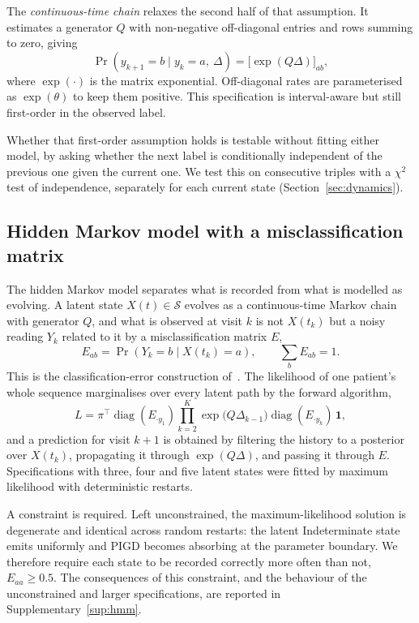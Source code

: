 \documentclass[11pt]{article}
\begin{document}
The \emph{continuous-time chain} relaxes the second half of that assumption. It
estimates a generator $Q$ with non-negative off-diagonal entries and rows summing
to zero, giving
\begin{equation}
\Pr(y_{k+1} = b \mid y_k = a,\ \Delta) = \bigl[\exp(Q\Delta)\bigr]_{ab},
\label{eq:ctmc}
\end{equation}
where $\exp(\cdot)$ is the matrix exponential. Off-diagonal rates are
parameterised as $\exp(\theta)$ to keep them positive. This specification is
interval-aware but still first-order in the observed label.

Whether that first-order assumption holds is testable without fitting either
model, by asking whether the next label is conditionally independent of the
previous one given the current one. We test this on consecutive triples with a
$\chi^2$ test of independence, separately for each current state
(Section~\ref{sec:dynamics}).

\subsection{Hidden Markov model with a misclassification matrix}
\label{sec:hmm}
The hidden Markov model separates what is recorded from what is modelled as
evolving. A latent state $X(t) \in \mathcal{S}$ evolves as a continuous-time
Markov chain with generator $Q$, and what is observed at visit $k$ is not
$X(t_k)$ but a noisy reading $Y_k$ related to it by a misclassification matrix
$E$,
\begin{equation}
E_{ab} = \Pr(Y_k = b \mid X(t_k) = a), \qquad \sum_b E_{ab} = 1 .
\label{eq:emission}
\end{equation}
This is the classification-error construction of~\citet{jackson2003}. The
likelihood of one patient's whole sequence marginalises over every latent path by
the forward algorithm,
\begin{equation}
L = \pi^{\!\top} \! \operatorname{diag}(E_{\cdot y_1})
    \prod_{k=2}^{K} \exp\!\bigl(Q \Delta_{k-1}\bigr)
    \operatorname{diag}(E_{\cdot y_k})\, \mathbf{1},
\label{eq:forward}
\end{equation}
and a prediction for visit $k+1$ is obtained by filtering the history to a
posterior over $X(t_k)$, propagating it through $\exp(Q\Delta)$, and passing it
through $E$. Specifications with three, four and five latent states were fitted
by maximum likelihood with deterministic restarts.

A constraint is required. Left unconstrained, the maximum-likelihood solution is
degenerate and identical across random restarts: the latent Indeterminate state
emits uniformly and PIGD becomes absorbing at the parameter boundary. We
therefore require each state to be recorded correctly more often than not,
$E_{aa} \geq 0.5$. The consequences of this constraint, and the behaviour of the
unconstrained and larger specifications, are reported in
Supplementary~\ref{sup:hmm}.
\end{document}
